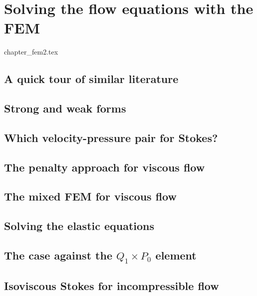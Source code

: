 \chapter{Solving the flow equations with the FEM} \label{solvingFEM} %

\begin{flushright} {\tiny {\color{gray} chapter\_fem2.tex}} \end{flushright}
\section{A quick tour of similar literature}  %

\section{Strong and weak forms}  %
\section{Which velocity-pressure pair for Stokes?}\label{ss:pair} %

\newpage
\section{The penalty approach for viscous flow}\label{sec:penalty} %
\newpage
\section{The mixed FEM for viscous flow} \label{sec:mixed}  %
\newpage
\section{Solving the elastic equations}  %
\section{The case against the $Q_1\times P_0$ element}  %
\section{Isoviscous Stokes for incompressible flow}\label{ss:isovisc}  %
